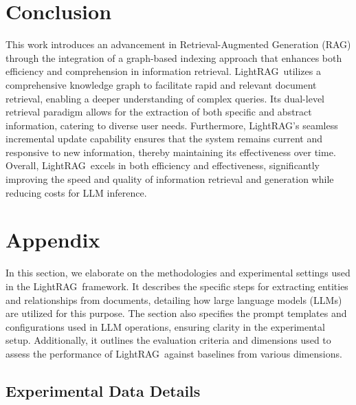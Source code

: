 \documentclass{article} %
\def\model{LightRAG}
\begin{document}
\vspace{-0.1in}

\section{Conclusion}\vspace{-0.1in}
\label{sec:conclusion}

This work introduces an advancement in Retrieval-Augmented Generation (RAG) through the integration of a graph-based indexing approach that enhances both efficiency and comprehension in information retrieval. \model\ utilizes a comprehensive knowledge graph to facilitate rapid and relevant document retrieval, enabling a deeper understanding of complex queries. Its dual-level retrieval paradigm allows for the extraction of both specific and abstract information, catering to diverse user needs. Furthermore, \model's seamless incremental update capability ensures that the system remains current and responsive to new information, thereby maintaining its effectiveness over time. Overall, \model\ excels in both efficiency and effectiveness, significantly improving the speed and quality of information retrieval and generation while reducing costs for LLM inference.


\clearpage




\clearpage

\section{Appendix}
\label{app:appendix}
In this section, we elaborate on the methodologies and experimental settings used in the \model\ framework. It describes the specific steps for extracting entities and relationships from documents, detailing how large language models (LLMs) are utilized for this purpose. The section also specifies the prompt templates and configurations used in LLM operations, ensuring clarity in the experimental setup. Additionally, it outlines the evaluation criteria and dimensions used to assess the performance of \model\ against baselines from various dimensions.

\subsection{Experimental Data Details}
\end{document}
